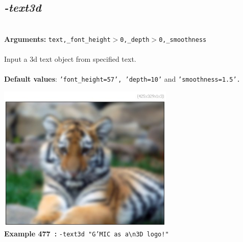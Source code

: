 \documentclass[a4paper,11pt,twoside]{book}
\begin{document}
\subsection{\emph{-text3d} }\vspace*{-0.5em}
~\\\textbf{Arguments: } 
{\small \texttt{text,\_font\_height$>$0,\_depth$>$0,\_smoothness}}\\~\\
Input a 3d text object from specified text.
~\\~\\\textbf{Default values}: {\small \texttt{'font\_height=57', 'depth=10'} and \texttt{'smoothness=1.5'.}}
\begin{center}\includegraphics[keepaspectratio=true,height=7cm,width=\textwidth]{img/gmic_def477.jpg}\\
{\footnotesize \textbf{Example 477~:} \texttt{-text3d "G'MIC as a\textbackslash n3D logo!"}}
\end{center}
\end{document}
